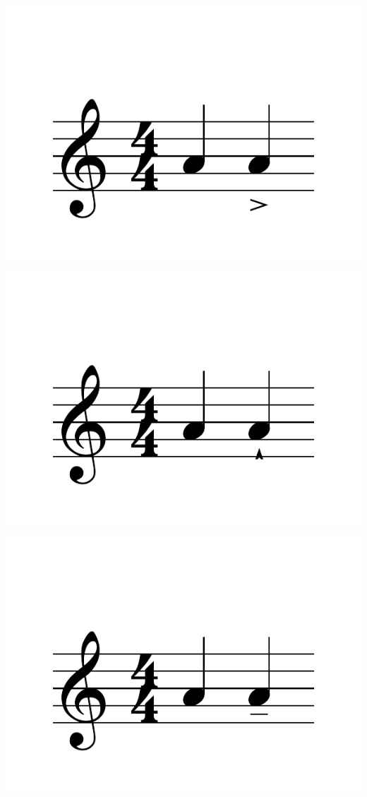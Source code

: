 \documentclass{article}
\begin{document}
\includegraphics[scale=0.5]{figures_tests/pdf/skern/articulations1.pdf}

\includegraphics[scale=0.5]{figures_tests/pdf/skern/articulations2.pdf}

\includegraphics[scale=0.5]{figures_tests/pdf/skern/articulations3.pdf}
\end{document}
